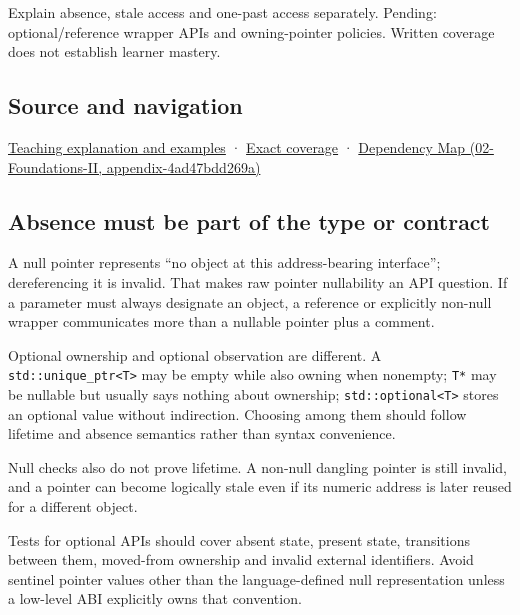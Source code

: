 Explain absence, stale access and one-past access separately. Pending: optional/reference wrapper APIs and owning-pointer policies. Written coverage does not establish learner mastery.

\subsection{Source and navigation}\label{appendix-afae48c31800-source-and-navigation}

\hyperref[01-foundations-i-ch003-a-pointer-carries-an-access-contract]{Teaching explanation and examples} · \hyperref[appendix-fd090d982a15-m008---parts-113-126]{Exact coverage} · \href{../02-Foundations-II/main.pdf\#nameddest=appendix-4ad47bdd269a}{Dependency Map (02-Foundations-II, appendix-4ad47bdd269a)}

\subsection{Absence must be part of the type or contract}\label{appendix-afae48c31800-absence-must-be-part-of-the-type-or-contract}

A null pointer represents ``no object at this address-bearing interface''; dereferencing it is invalid. That makes raw pointer nullability an API question. If a parameter must always designate an object, a reference or explicitly non-null wrapper communicates more than a nullable pointer plus a comment.

Optional ownership and optional observation are different. A \texttt{std::unique\_ptr\textless{}T\textgreater{}} may be empty while also owning when nonempty; \texttt{T*} may be nullable but usually says nothing about ownership; \texttt{std::optional\textless{}T\textgreater{}} stores an optional value without indirection. Choosing among them should follow lifetime and absence semantics rather than syntax convenience.

Null checks also do not prove lifetime. A non-null dangling pointer is still invalid, and a pointer can become logically stale even if its numeric address is later reused for a different object.

Tests for optional APIs should cover absent state, present state, transitions between them, moved-from ownership and invalid external identifiers. Avoid sentinel pointer values other than the language-defined null representation unless a low-level ABI explicitly owns that convention.
